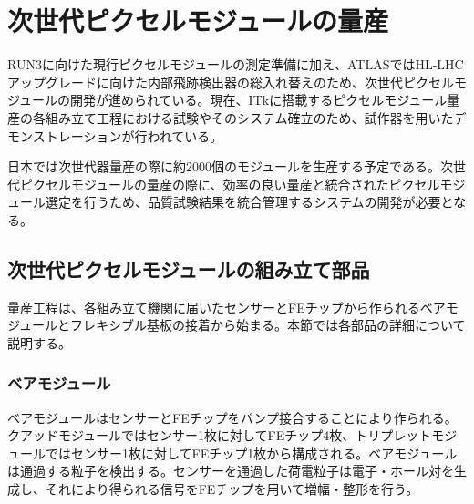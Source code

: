 \chapter{次世代ピクセルモジュールの量産}
\label{sec:singatapixel-devel}
RUN3に向けた現行ピクセルモジュールの測定準備に加え、ATLASではHL-LHCアップグレードに向けた内部飛跡検出器の総入れ替えのため、次世代ピクセルモジュールの開発が進められている。現在、ITkに搭載するピクセルモジュール量産の各組み立て工程における試験やそのシステム確立のため、試作器を用いたデモンストレーションが行われている。

日本では次世代器量産の際に約$2000$個のモジュールを生産する予定である。次世代ピクセルモジュールの量産の際に、効率の良い量産と統合されたピクセルモジュール選定を行うため、品質試験結果を統合管理するシステムの開発が必要となる。


\section{次世代ピクセルモジュールの組み立て部品}
\label{sec:component}
量産工程は、各組み立て機関に届いたセンサーとFEチップから作られるベアモジュールとフレキシブル基板の接着から始まる。本節では各部品の詳細について説明する。


\subsection{ベアモジュール}
\label{sec:bare}

ベアモジュールはセンサーとFEチップをバンプ接合することにより作られる。クアッドモジュールではセンサー1枚に対してFEチップ4枚、トリプレットモジュールではセンサー1枚に対してFEチップ1枚から構成される。ベアモジュールは通過する粒子を検出する。センサーを通過した荷電粒子は電子・ホール対を生成し、それにより得られる信号をFEチップを用いて増幅・整形を行う。

